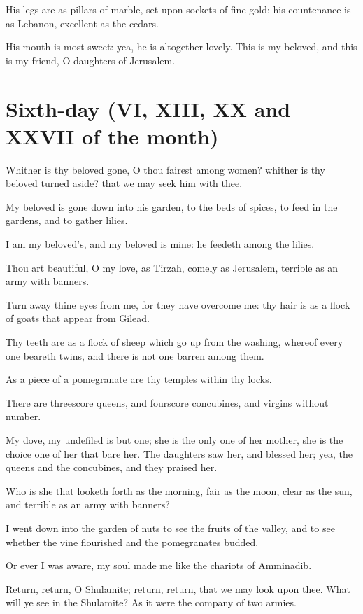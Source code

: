 His legs are as pillars of marble, set upon sockets of fine gold: his countenance is as Lebanon, excellent as the cedars.

His mouth is most sweet: yea, he is altogether lovely. This is my beloved, and this is my friend, O daughters of Jerusalem.

\section*{Sixth-day (VI, XIII, XX and XXVII of the month)}

Whither is thy beloved gone, O thou fairest among women? whither is thy beloved turned aside? that we may seek him with thee.

My beloved is gone down into his garden, to the beds of spices, to feed in the gardens, and to gather lilies.

I am my beloved's, and my beloved is mine: he feedeth among the lilies.

Thou art beautiful, O my love, as Tirzah, comely as Jerusalem, terrible as an army with banners.

Turn away thine eyes from me, for they have overcome me: thy hair is as a flock of goats that appear from Gilead.

Thy teeth are as a flock of sheep which go up from the washing, whereof every one beareth twins, and there is not one barren among them.

As a piece of a pomegranate are thy temples within thy locks.

There are threescore queens, and fourscore concubines, and virgins without number.

My dove, my undefiled is but one; she is the only one of her mother, she is the choice one of her that bare her. The daughters saw her, and blessed her; yea, the queens and the concubines, and they praised her.

Who is she that looketh forth as the morning, fair as the moon, clear as the sun, and terrible as an army with banners?

I went down into the garden of nuts to see the fruits of the valley, and to see whether the vine flourished and the pomegranates budded.

Or ever I was aware, my soul made me like the chariots of Amminadib.

Return, return, O Shulamite; return, return, that we may look upon thee. What will ye see in the Shulamite? As it were the company of two armies.

